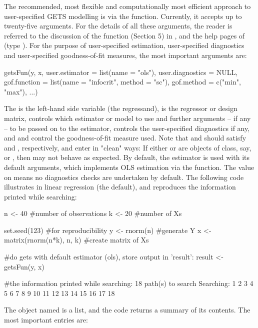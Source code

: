 The recommended, most flexible and computationally most efficient approach to user-specified GETS modelling is via the  function. Currently, it accepts up to twenty-five arguments. For the details of all these arguments, the reader is referred to the discussion of the  function (Section 5) in \cite{PretisReadeSucarrat2018}, and the help pages of  (type ). For the purpose of user-specified estimation, user-specified diagnostics and user-specified goodness-of-fit measures, the most important arguments are:
%
\begin{example}
  getsFun(y, x,
    user.estimator = list(name = "ols"),
    user.diagnostics = NULL,
    gof.function = list(name = "infocrit", method = "sc"),
    gof.method = c("min", "max"),
    ...)
\end{example}
%
The  is the left-hand side variable (the regressand),  is the regressor or design matrix,  controls which estimator or model to use and further arguments -- if any -- to be passed on to the estimator,  controls the user-specified diagnostics if any, and  and  control the goodness-of-fit measure used. Note that  and  should satisfy  and , respectively, and enter in "clean" ways: If either  or  are objects of class, say,  or , then  may not behave as expected. By default, the estimator  is used with its default arguments, which implements OLS estimation via the  function. The value  on  means no diagnostics checks are undertaken by default. The following code illustrates  in linear regression (the default), and reproduces the information printed while searching:
%
\begin{example}
  n <- 40 #number of observations
  k <- 20 #number of Xs

  set.seed(123) #for reproducibility
  y <- rnorm(n) #generate Y
  x <- matrix(rnorm(n*k), n, k) #create matrix of Xs

  #do gets with default estimator (ols), store output in 'result':
  result <- getsFun(y, x)

  #the information printed while searching:
  18 path(s) to search
  Searching: 1 2 3 4 5 6 7 8 9 10 11 12 13 14 15 16 17 18 
\end{example}
%
The object named  is a list, and the code  returns a summary of its contents. The most important entries are:

